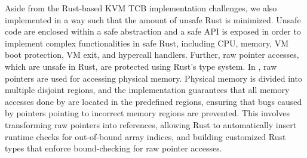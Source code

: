 Aside from the Rust-based KVM TCB implementation challenges, we also
implemented \rustcore{} in a way such that the amount of unsafe Rust is
minimized.
Unsafe code are enclosed within a safe abstraction and a safe API is exposed
in order to implement complex functionalities in safe Rust, including CPU,
memory, VM boot protection, VM exit, and hypercall handlers.
Further, raw pointer accesses, which are unsafe in Rust, are protected using
Rust’s type system. In \rustcore{}, raw pointers are used for accessing
physical memory. Physical memory is divided into multiple disjoint regions,
and the \rustcore{} implementation guarantees that all memory accesses done by
\rustcore{} are located in the predefined regions, ensuring that bugs caused by
pointers pointing to incorrect memory regions are prevented.
This involves transforming raw pointers into references, allowing Rust to
automatically insert runtime checks for out-of-bound array indices, and
building customized Rust types that enforce bound-checking for raw pointer
accesses.


